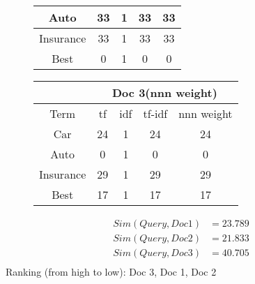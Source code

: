 \documentclass[11pt]{article}
\begin{document}
\begin{figure}[H]
\begin{minipage}{0.5\linewidth}
\begin{table}[H]
\begin{tabular}{|c|c|c|c|c|}
        Auto     & 33 &1    & 33& 33\\ \hline
        Insurance& 33 &1    & 33& 33\\ \hline
        Best     & 0  &1    & 0 & 0\\ \hline
      \end{tabular}
    \end{table}
  \end{minipage}
  \begin{minipage}{0.5\linewidth}
    \begin{table}[H]
      \centering
      \begin{tabular}{|c|c|c|c|c|} \hline
        & \multicolumn{4}{|c|}{Doc 3(nnn weight)}\\ \hline
        Term     & tf & idf & tf-idf & nnn weight \\ \hline
        Car      & 24 &1 & 24& 24 \\ \hline
        Auto     & 0  &1 & 0& 0\\ \hline
        Insurance& 29 &1 & 29& 29\\ \hline
        Best     & 17 &1 & 17& 17\\ \hline
      \end{tabular}
    \end{table}
  \end{minipage}
\end{figure}
\begin{align*}
  Sim(Query, Doc 1) &= 23.789 \\
  Sim(Query, Doc 2) &= 21.833 \\
  Sim(Query, Doc 3) &= 40.705 \\
\end{align*}
Ranking (from high to low): Doc 3, Doc 1, Doc 2
\end{document}
